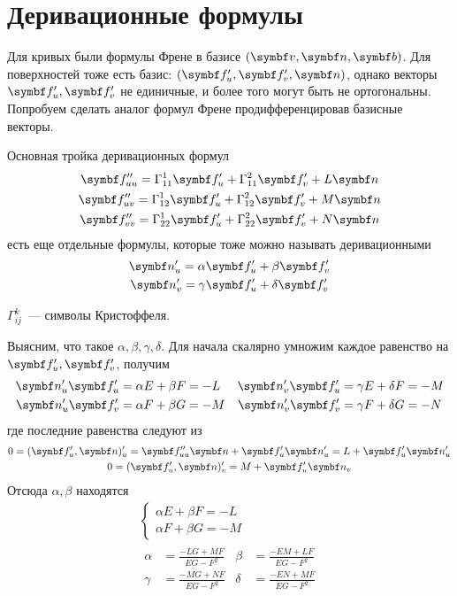 \documentclass[main]{subfiles}
\begin{document}
\chapter{Деривационные формулы}
Для кривых были формулы Френе в базисе $(\vv, \vn, \vb)$.
Для поверхностей тоже есть базис: $(\vf'_u, \vf'_v, \vn)$, однако векторы $\vf'_u, \vf'_v$ не единичные,
и более того могут быть не ортогональны.
Попробуем сделать аналог формул Френе продифференцировав базисные векторы.
\begin{definition}
    Основная тройка деривационных формул
    \begin{gather*}
        \vf''_{uu} = \Gamma^1_{11} \vf'_u + \Gamma^2_{11} \vf'_v + L \vn \\
        \vf''_{uv} = \Gamma^1_{12} \vf'_u + \Gamma^2_{12} \vf'_v + M \vn \\
        \vf''_{vv} = \Gamma^1_{22} \vf'_u + \Gamma^2_{22} \vf'_v + N \vn
    \end{gather*}
    есть еще отдельные формулы, которые тоже можно называть деривационными
    \begin{gather*}
        \vn'_u = \alpha \vf'_u + \beta \vf'_v\\
        \vn'_v = \gamma \vf'_u + \delta \vf'_v
    \end{gather*}
\end{definition}
\begin{definition}
    $\Gamma^k_{ij}$~--- символы Кристоффеля.
\end{definition}
Выясним, что такое $\alpha, \beta, \gamma, \delta$.
Для начала скалярно умножим каждое равенство на $\vf'_u, \vf'_v$, получим
\begin{align*}
    \vn'_u \vf'_u & = \alpha E + \beta F = -L & \vn'_v \vf'_u & = \gamma E + \delta F = -M \\
    \vn'_u \vf'_v & = \alpha F + \beta G = -M & \vn'_v \vf'_v & = \gamma F + \delta G = -N
\end{align*}
где последние равенства следуют из
\begin{gather*}
    0 = (\vf'_u, \vn)'_u = \vf''_{uu} \vn + \vf'_u \vn'_u = L + \vf'_u \vn'_u\\
    0 = (\vf'_u, \vn)'_v = M + \vf'_u \vn_v
\end{gather*}
Отсюда $\alpha, \beta$ находятся
\begin{gather*}
    \begin{cases}
        \alpha E + \beta F = -L \\
        \alpha F + \beta G = -M
    \end{cases}\\
    \begin{aligned}
        \alpha & = \frac{-LG + MF}{EG - F^2} & \beta  & = \frac{-EM + LF}{EG - F^2} \\
        \gamma & = \frac{-MG + NF}{EG - F^2} & \delta & = \frac{-EN + MF}{EG - F^2}
    \end{aligned}
\end{gather*}
\end{document}
